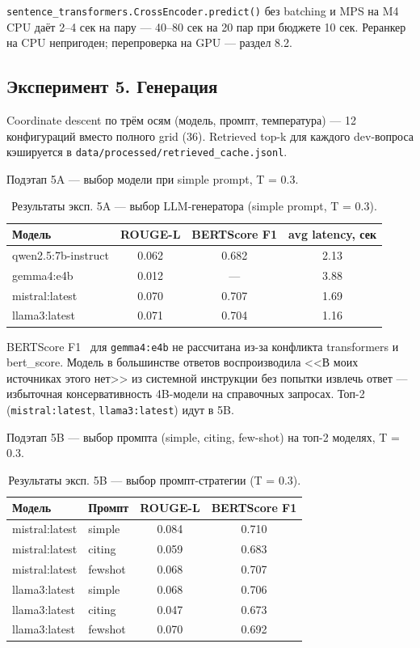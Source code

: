 \documentclass[a4paper,12pt]{extarticle}
\begin{document}
\texttt{sentence\_transformers.CrossEncoder.predict()} без batching и MPS на M4 CPU даёт 2--4 сек на пару --- 40--80 сек на 20 пар при бюджете 10 сек. Реранкер на CPU непригоден; перепроверка на GPU --- раздел 8.2.

\subsection{Эксперимент 5. Генерация}

Coordinate descent по трём осям (модель, промпт, температура) --- 12 конфигураций вместо полного grid (36). Retrieved top-k для каждого dev-вопроса кэшируется в \texttt{data/processed/retrieved\_cache.jsonl}.

Подэтап 5A --- выбор модели при simple prompt, T = 0.3.

\begin{table}[ht]
\caption{Результаты эксп. 5A --- выбор LLM-генератора (simple prompt, T = 0.3).}
\label{tab:exp5a}
\centering
\begin{tabular}{lccc}
\toprule
Модель & ROUGE-L & BERTScore F1 & avg latency, сек \\
\midrule
qwen2.5:7b-instruct & 0.062 & 0.682 & 2.13 \\
gemma4:e4b & 0.012 & --- & 3.88 \\
mistral:latest & 0.070 & 0.707 & 1.69 \\
llama3:latest & 0.071 & 0.704 & 1.16 \\
\bottomrule
\end{tabular}
\end{table}

BERTScore F1~\cite{bertscore} для \texttt{gemma4:e4b} не рассчитана из-за конфликта transformers и bert\_score. Модель в большинстве ответов воспроизводила <<В моих источниках этого нет>> из системной инструкции без попытки извлечь ответ --- избыточная консервативность 4B-модели на справочных запросах. Топ-2 (\texttt{mistral:latest}, \texttt{llama3:latest}) идут в 5B.

Подэтап 5B --- выбор промпта (simple, citing, few-shot) на топ-2 моделях, T = 0.3.

\begin{table}[ht]
\caption{Результаты эксп. 5B --- выбор промпт-стратегии (T = 0.3).}
\label{tab:exp5b}
\centering
\begin{tabular}{llcc}
\toprule
Модель & Промпт & ROUGE-L & BERTScore F1 \\
\midrule
mistral:latest & simple & 0.084 & 0.710 \\
mistral:latest & citing & 0.059 & 0.683 \\
mistral:latest & fewshot & 0.068 & 0.707 \\
llama3:latest & simple & 0.068 & 0.706 \\
llama3:latest & citing & 0.047 & 0.673 \\
llama3:latest & fewshot & 0.070 & 0.692 \\
\bottomrule
\end{tabular}
\end{table}
\end{document}

